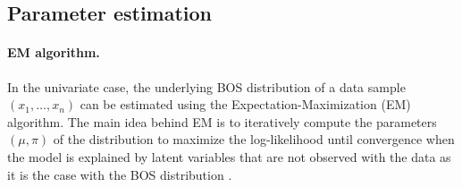 \documentclass[a4paper,12pt]{article}
\newcommand{\tm}[1]{\todo[inline,color=orange!40]{{\textbf{TM:}~}#1}}
\newcommand{\ar}[1]{\todo[inline,color=green!40]{{\textbf{AR:}~}#1}}
\begin{document}


\subsection{Parameter estimation}
\paragraph{EM algorithm.} In the univariate case, the underlying BOS distribution of a data sample $(x_1, \ldots, x_n)$ can be estimated using the Expectation-Maximization (EM) algorithm. The main idea behind EM is to iteratively compute the parameters $(\mu, \pi)$ of the distribution to maximize the log-likelihood until convergence when the model is explained by latent variables that are not observed with the data as it is the case with the BOS distribution \citep{biernacki2016model}.
\end{document}
